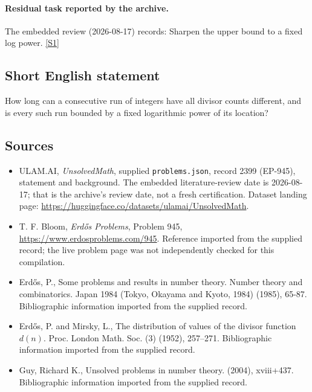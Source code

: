 \documentclass[11pt,a4paper]{article}
\newcommand{\sref}[2]{\hyperlink{source:#1:#2}{[S#2]}}
\begin{document}
\paragraph{Residual task reported by the archive.}

The embedded review (2026-08-17) records: Sharpen the upper bound to a fixed log power. \sref{2399}{1}

\subsection{Short English statement}

How long can a consecutive run of integers have all divisor counts different, and is every such run bounded by a fixed logarithmic power of its location?

\subsection{Sources}

{\small

\begin{itemize}

\item[\hypertarget{source:2399:1}{S1}] ULAM.AI, \emph{UnsolvedMath}, supplied \texttt{problems.json}, record 2399 (EP-945), statement and background. The embedded literature-review date is 2026-08-17; that is the archive’s review date, not a fresh certification. Dataset landing page: \url{https://huggingface.co/datasets/ulamai/UnsolvedMath}.

\item[\hypertarget{source:2399:2}{S2}] T. F. Bloom, \emph{Erdős Problems}, Problem 945, \url{https://www.erdosproblems.com/945}. Reference imported from the supplied record; the live problem page was not independently checked for this compilation.

\item[\hypertarget{source:2399:3}{S3}] Erd\H{o}s, P., Some problems and results in number theory. Number theory and combinatorics. Japan 1984 (Tokyo, Okayama and Kyoto, 1984) (1985), 65-87. Bibliographic information imported from the supplied record.

\item[\hypertarget{source:2399:4}{S4}] Erd\H{o}s, P. and Mirsky, L., The distribution of values of the divisor function {$d(n)$}. Proc. London Math. Soc. (3) (1952), 257--271. Bibliographic information imported from the supplied record.

\item[\hypertarget{source:2399:5}{S5}] Guy, Richard K., Unsolved problems in number theory. (2004), xviii+437. Bibliographic information imported from the supplied record.

\end{itemize}

}

\label{end:2399}
\end{document}
